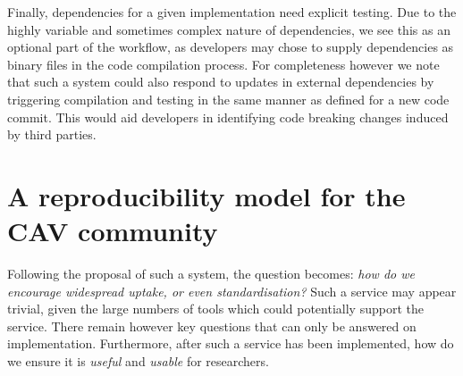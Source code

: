 \documentclass{llncs}
\begin{document}
Finally, dependencies for a given implementation need explicit
testing. Due to the highly variable and sometimes complex nature of
dependencies, we see this as an optional part of the workflow, as
developers may chose to supply dependencies as binary files in the
code compilation process. For completeness however we note that such a
system could also respond to updates in external dependencies by
triggering compilation and testing in the same manner as defined for a
new code commit. This would aid developers in identifying code
breaking changes induced by third parties.


\section{A reproducibility model for the CAV community}\label{rollout}

Following the proposal of such a system, the question becomes:
{\emph{how do we encourage widespread uptake, or even standardisation?}}
Such a service may appear trivial, given the large numbers of tools
which could potentially support the service. There remain however key
questions that can only be answered on implementation. Furthermore,
after such a service has been implemented, how do we ensure it is
\emph{useful} and \emph{usable} for researchers.

\end{document}
